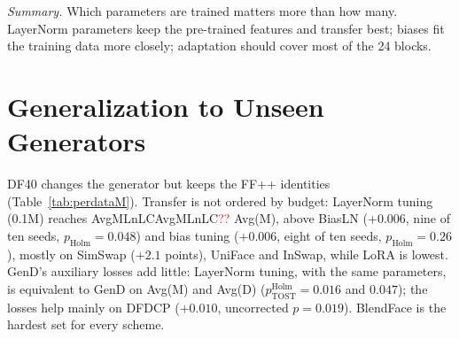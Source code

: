 \documentclass[fonts]{icst}
\newcommand{\num}[1]{\ifcsname #1\endcsname\csname #1\endcsname\else\textcolor{red}{??}\fi}
\begin{document}
\textit{Summary.} Which parameters are trained matters more than how many. LayerNorm parameters keep the pre-trained features and transfer best; biases fit the training data more closely; adaptation should cover most of the 24 blocks.

\section{Generalization to Unseen Generators}
\label{sec:rq3}


DF40 changes the generator but keeps the FF++ identities (Table~\ref{tab:perdataM}). Transfer is not ordered by budget: LayerNorm tuning (0.1M) reaches \num{AvgMLnLC} Avg(M), above BiasLN ($+0.006$, nine of ten seeds, $p_{\mathrm{Holm}}=0.048$) and bias tuning ($+0.006$, eight of ten seeds, $p_{\mathrm{Holm}}=0.26$), mostly on SimSwap ($+2.1$ points), UniFace and InSwap, while LoRA is lowest. GenD's auxiliary losses add little: LayerNorm tuning, with the same parameters, is equivalent to GenD on Avg(M) and Avg(D) ($p^{\mathrm{Holm}}_{\mathrm{TOST}}=0.016$ and $0.047$); the losses help mainly on DFDCP ($+0.010$, uncorrected $p=0.019$). BlendFace is the hardest set for every scheme.

\begin{table}[!htb]
\centering
\caption{Measured cost on an NVIDIA A100-40GB (fp32, $224\times224$). Train: batch 32, forward + backward + Adam step. Infer: batch 1. Ckpt: size of the stored trainable tensors.}
\label{tab:cost}
\end{table}
\end{document}
